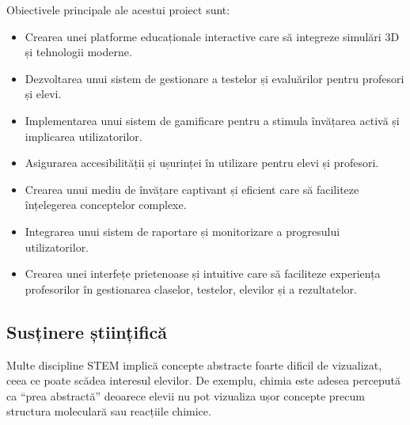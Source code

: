 \onehalfspacing
Obiectivele principale ale acestui proiect sunt:
\begin{itemize}
    \item Crearea unei platforme educaționale interactive care să integreze simulări 3D și tehnologii moderne.
    \item Dezvoltarea unui sistem de gestionare a testelor și evaluărilor pentru profesori și elevi.
    \item Implementarea unui sistem de gamificare pentru a stimula învățarea activă și implicarea utilizatorilor.
    \item Asigurarea accesibilității și ușurinței în utilizare pentru elevi și profesori.
    \item Crearea unui mediu de învățare captivant și eficient care să faciliteze înțelegerea conceptelor complexe.
    \item Integrarea unui sistem de raportare și monitorizare a progresului utilizatorilor.
    \item Crearea unei interfețe prietenoase și intuitive care să faciliteze experiența profesorilor în gestionarea
     claselor, testelor, elevilor și a rezultatelor.
\end{itemize}



\subsection{Susținere științifică}
\label{sub-sec:proj-scientific-support}


Multe discipline STEM implică concepte abstracte foarte dificil de vizualizat, ceea ce poate scădea interesul elevilor.
De exemplu, chimia este adesea percepută ca “prea abstractă” deoarece elevii nu pot vizualiza ușor concepte precum
structura moleculară sau reacțiile chimice. 


